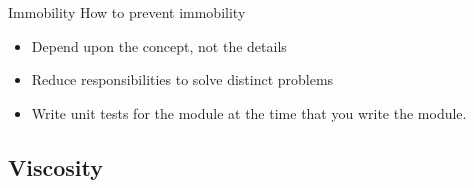 \documentclass[xcolor=svgnames]{beamer}
\begin{document}

{%
%
\begin{frame}{\subsecname}
    \begin{minipage}{\columnwidth}
    \end{minipage}
\end{frame}
}


{%
%
\begin{frame}{Immobility}
    How to prevent immobility
    \begin{itemize}
        \item<1-> Depend upon the concept, not the details
        \item<2-> Reduce responsibilities to solve distinct problems
        \item<3-> Write unit tests for the module at the time that you write 
                  the module.
    \end{itemize}
\end{frame}
}






\subsection{Viscosity}
\renewcommand{\background}{chaos}
\end{document}
